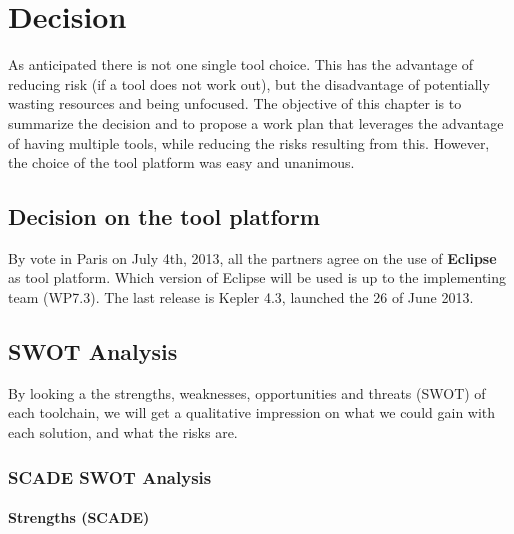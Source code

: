 
\newcommand{\decision}[1]{
\begin{center}
\begin{tabular}{ p{13cm} }
\stepcounter{decision}\textbf{Decision~\arabic{decision}}  \\
\hline
\multicolumn{1}{|p{13cm}|}{#1} \\
\hline
\end{tabular}
\end{center}
}


\chapter{Decision}
\label{sec:decision}

As anticipated there is not one single tool choice. This has the advantage of reducing risk (if a tool does not work out), but the disadvantage of potentially wasting resources and being unfocused.  The objective of this chapter is to summarize the decision and to propose a work plan that leverages the advantage of having multiple tools, while reducing the risks resulting from this.  However, the choice of the tool platform was easy and unanimous.

\section{Decision on the tool platform}
\label{sec:decision_platform}

By vote in Paris on July 4th, 2013, all the partners agree on the use of \textbf{Eclipse} as tool platform.  Which version of Eclipse will be used is up to the implementing team (WP7.3).  The last release is Kepler 4.3, launched the 26 of June 2013.

\section{SWOT Analysis}

By looking a the strengths, weaknesses, opportunities and threats (SWOT) of each toolchain, we will get a qualitative impression on what we could gain with each solution, and what the risks are.

\subsection{SCADE SWOT Analysis}

\subsubsection{Strengths (SCADE)}

